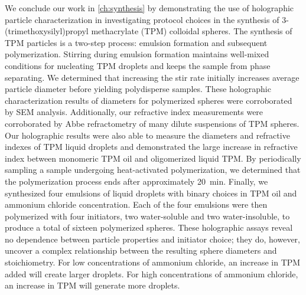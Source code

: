 We conclude our work in \autoref{ch:synthesis} by demonstrating the use of holographic
particle characterization in investigating protocol choices in the synthesis of
3-(trimethoxysilyl)propyl methacrylate (TPM) colloidal spheres.
The synthesis of TPM particles is a two-step process: emulsion formation and subsequent
polymerization. Stirring during emulsion formation maintains well-mixed conditions for
nucleating TPM droplets and keeps the sample from phase separating. We determined
that increasing the stir rate initially increases average particle diameter
before yielding polydisperse samples. These holographic characterization results
of diameters for polymerized spheres were corroborated by SEM analysis. Additionally,
our refractive index measurements were corroborated by Abbe refractometry of many
dilute suspensions of TPM spheres. Our holographic results were also able to measure
the diameters and refractive indexes of TPM liquid droplets and demonstrated the large
increase in refractive index between monomeric TPM oil and oligomerized liquid TPM.
By periodically sampling a sample undergoing heat-activated polymerization, we
determined that the polymerization process ends after approximately \SI{20}{\minute}.
Finally, we synthesized four emulsions of liquid droplets with
binary choices in TPM oil and ammonium chloride concentration. Each of the four
emulsions were then polymerized with four initiators, two water-soluble and two
water-insoluble, to produce a total of sixteen polymerized spheres.
These holographic assays reveal no dependence between particle properties and initiator choice;
they do, however, uncover a complex relationship between the resulting sphere diameters
and stoichiometry. For low concentrations of ammonium chloride,
an increase in TPM added will create larger droplets. For high concentrations of ammonium
chloride, an increase in TPM will generate more droplets.




